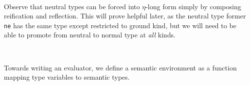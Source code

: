 \documentclass[authoryear, acmsmall, screen, review, nonacm]{acmart}
\begin{document}
\begin{code}%
\>[0]\AgdaSpace{}%
\AgdaSymbol{\{}\AgdaSpace{}%
\AgdaSymbol{=}\AgdaSpace{}%
\AgdaSpace{}%
\AgdaSpace{}%
\AgdaSymbol{\}}\AgdaSpace{}%
\AgdaSpace{}%
\AgdaSymbol{=}\AgdaSpace{}%
\AgdaSpace{}%
\<%
\\
\>[0]\AgdaSpace{}%
\AgdaSymbol{\{}\AgdaSpace{}%
\AgdaSymbol{=}\AgdaSpace{}%
\AgdaSymbol{\}}\AgdaSpace{}%
\AgdaSpace{}%
\AgdaSymbol{=}\AgdaSpace{}%
\AgdaSpace{}%
\AgdaSymbol{(}\AgdaSpace{}%
\AgdaSymbol{(}\AgdaSpace{}%
\AgdaSpace{}%
\AgdaSymbol{(}\AgdaSpace{}%
\AgdaSymbol{\{}\AgdaSpace{}%
\AgdaSymbol{=}\AgdaSpace{}%
\AgdaSymbol{\}}\AgdaSpace{}%
\AgdaSymbol{(}\AgdaSpace{}%
\AgdaSymbol{))))}\<%
\end{code}

Observe that neutral types can be forced into $\eta$-long form simply by composing reification and reflection. This will prove helpful later, as the neutral type former \verb!ne! has the same type except restricted to ground kind, but we will need to be able to promote from neutral to normal type at \emph{all} kinds.

\begin{code}%
\>[0]\AgdaSpace{}%
\AgdaSymbol{:}\AgdaSpace{}%
\AgdaSpace{}%
\AgdaSpace{}%
\AgdaSpace{}%
\AgdaSpace{}%
\AgdaSpace{}%
\AgdaSpace{}%
\<%
\\
\>[0]\AgdaSpace{}%
\AgdaSymbol{=}\AgdaSpace{}%
\AgdaSpace{}%
\AgdaSpace{}%
\<%
\end{code}

Towards writing an evaluator, we define a semantic environment as a function mapping type variables to semantic types.

\begin{code}%
\>[0]\AgdaSpace{}%
\AgdaSymbol{:}\AgdaSpace{}%
\AgdaSpace{}%
\AgdaSpace{}%
\AgdaSpace{}%
\AgdaSpace{}%
\<%
\\
\>[0]\AgdaSpace{}%
\AgdaSpace{}%
\AgdaSpace{}%
\AgdaSymbol{=}\AgdaSpace{}%
\AgdaSpace{}%
\AgdaSymbol{\{}\AgdaSymbol{\}}\AgdaSpace{}%
\AgdaSpace{}%
\AgdaSpace{}%
\AgdaSpace{}%
\AgdaSpace{}%
\AgdaSpace{}%
\AgdaSpace{}%
\AgdaSpace{}%
\<%
\end{code}
\end{document}
